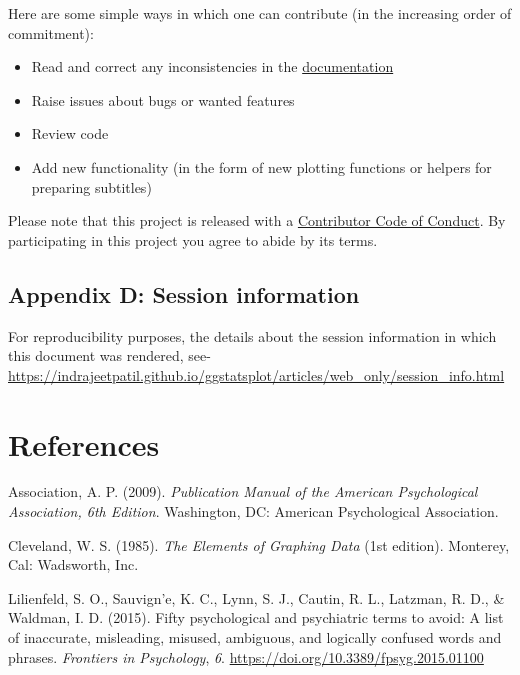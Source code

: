 \documentclass[]{article}
\begin{document}
Here are some simple ways in which one can contribute (in the increasing order
of commitment):

\begin{itemize}
\item
  Read and correct any inconsistencies in the
  \href{https://indrajeetpatil.github.io/ggstatsplot/}{documentation}
\item
  Raise issues about bugs or wanted features
\item
  Review code
\item
  Add new functionality (in the form of new plotting functions or helpers for
  preparing subtitles)
\end{itemize}

Please note that this project is released with a
\href{https://github.com/IndrajeetPatil/ggstatsplot/blob/master/CODE_OF_CONDUCT.md}{Contributor Code of Conduct}. By participating in this project you agree to abide by its terms.

\hypertarget{appendix-d-session-information}{%
\subsection{Appendix D: Session information}\label{appendix-d-session-information}}

For reproducibility purposes, the details about the session information in which
this document was rendered, see-
\url{https://indrajeetpatil.github.io/ggstatsplot/articles/web_only/session_info.html}

\newpage

\hypertarget{references}{%
\section*{References}\label{references}}

\hypertarget{refs}{}
\leavevmode\hypertarget{ref-associationPublicationManualAmerican2009}{}%
Association, A. P. (2009). \emph{Publication Manual of the American Psychological Association, 6th Edition}. Washington, DC: American Psychological Association.

\leavevmode\hypertarget{ref-clevelandElementsGraphingData1985}{}%
Cleveland, W. S. (1985). \emph{The Elements of Graphing Data} (1st edition). Monterey, Cal: Wadsworth, Inc.

\leavevmode\hypertarget{ref-lilienfeldFiftyPsychologicalPsychiatric2015}{}%
Lilienfeld, S. O., Sauvign\a'e, K. C., Lynn, S. J., Cautin, R. L., Latzman, R. D., \& Waldman, I. D. (2015). Fifty psychological and psychiatric terms to avoid: A list of inaccurate, misleading, misused, ambiguous, and logically confused words and phrases. \emph{Frontiers in Psychology}, \emph{6}. \url{https://doi.org/10.3389/fpsyg.2015.01100}
\end{document}
